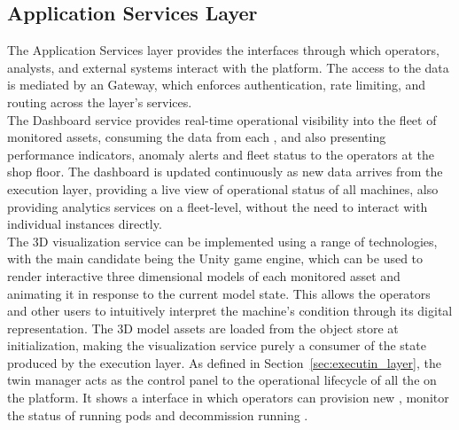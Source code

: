 \subsection{Application Services Layer}

The Application Services layer provides the interfaces through which operators, analysts, and external systems interact with the platform. The access to the data is mediated by an \API Gateway, which enforces authentication, rate limiting, and routing across the layer's services.\\
The Dashboard service provides real-time operational visibility into the fleet of monitored assets, consuming the data from each \DTPod, and also presenting performance indicators, anomaly alerts and fleet status to the operators at the shop floor. The dashboard is updated continuously as new data arrives from the execution layer, providing a live view of operational status of all machines, also providing analytics services on a fleet-level, without the need to interact with individual \DTs instances directly.\\
The 3D visualization service can be implemented using a range of technologies, with the main candidate being the Unity game engine, which can be used to render interactive three dimensional models of each monitored asset and animating it in response to the current model state. This allows the operators and other users to intuitively interpret the machine's condition through its digital representation. The 3D model assets are loaded from the object store at initialization, making the visualization service purely a consumer of the state produced by the execution layer.
As defined in Section~\ref{sec:executin_layer}, the twin manager acts as the control panel to the operational lifecycle of all the \DTs on the platform. It shows a interface in which operators can provision new \DTs, monitor the status of running pods and decommission running \DTs. 

